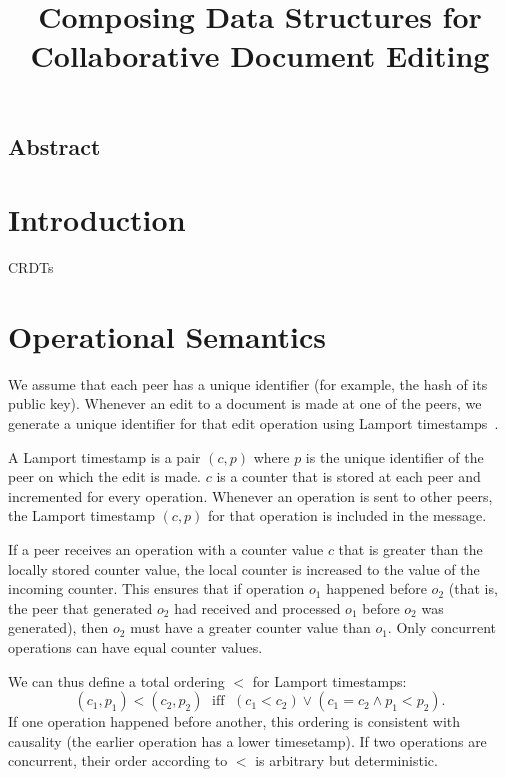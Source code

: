\documentclass[a4paper,twocolumn,10pt]{article}
\begin{document}
\sloppy
\title{Composing Data Structures for Collaborative Document Editing}
\author{}
\maketitle

\subsection*{Abstract}

\section{Introduction}

CRDTs~\cite{Shapiro:2011wy,Roh:2011dw}

\section{Operational Semantics}

We assume that each peer has a unique identifier (for example, the hash of its public key). Whenever an edit to a document is made at one of the peers, we generate a unique identifier for that edit operation using Lamport timestamps~\cite{Lamport:1978jq}.

A Lamport timestamp is a pair $(c, p)$ where $p$ is the unique identifier of the peer on which the edit is made. $c$ is a counter that is stored at each peer and incremented for every operation. Whenever an operation is sent to other peers, the Lamport timestamp $(c, p)$ for that operation is included in the message.

If a peer receives an operation with a counter value $c$ that is greater than the locally stored counter value, the local counter is increased to the value of the incoming counter. This ensures that if operation $o_1$ happened before $o_2$ (that is, the peer that generated $o_2$ had received and processed $o_1$ before $o_2$ was generated), then $o_2$ must have a greater counter value than $o_1$. Only concurrent operations can have equal counter values.

We can thus define a total ordering $<$ for Lamport timestamps:
$$(c_1, p_1) < (c_2, p_2) \;\text{ iff }\; (c_1 < c_2) \vee (c_1 = c_2 \wedge p_1 < p_2).$$
If one operation happened before another, this ordering is consistent with causality (the earlier operation has a lower timesetamp). If two operations are concurrent, their order according to $<$ is arbitrary but deterministic.
\end{document}
